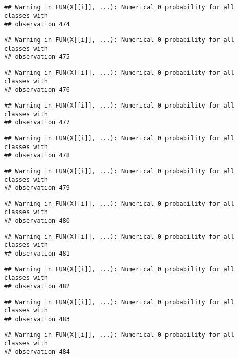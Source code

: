 \documentclass[
]{article}
\begin{document}
\begin{verbatim}
## Warning in FUN(X[[i]], ...): Numerical 0 probability for all classes with
## observation 474
\end{verbatim}

\begin{verbatim}
## Warning in FUN(X[[i]], ...): Numerical 0 probability for all classes with
## observation 475
\end{verbatim}

\begin{verbatim}
## Warning in FUN(X[[i]], ...): Numerical 0 probability for all classes with
## observation 476
\end{verbatim}

\begin{verbatim}
## Warning in FUN(X[[i]], ...): Numerical 0 probability for all classes with
## observation 477
\end{verbatim}

\begin{verbatim}
## Warning in FUN(X[[i]], ...): Numerical 0 probability for all classes with
## observation 478
\end{verbatim}

\begin{verbatim}
## Warning in FUN(X[[i]], ...): Numerical 0 probability for all classes with
## observation 479
\end{verbatim}

\begin{verbatim}
## Warning in FUN(X[[i]], ...): Numerical 0 probability for all classes with
## observation 480
\end{verbatim}

\begin{verbatim}
## Warning in FUN(X[[i]], ...): Numerical 0 probability for all classes with
## observation 481
\end{verbatim}

\begin{verbatim}
## Warning in FUN(X[[i]], ...): Numerical 0 probability for all classes with
## observation 482
\end{verbatim}

\begin{verbatim}
## Warning in FUN(X[[i]], ...): Numerical 0 probability for all classes with
## observation 483
\end{verbatim}

\begin{verbatim}
## Warning in FUN(X[[i]], ...): Numerical 0 probability for all classes with
## observation 484
\end{verbatim}
\end{document}
